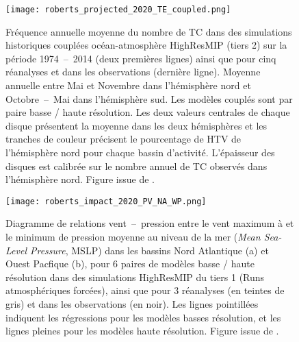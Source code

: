 \documentclass[../main.tex]{subfiles}
\begin{document}
\begin{figure}[tb]
    \centering
    \texttt{[image: roberts\_projected\_2020\_TE\_coupled.png]}
    \caption{Fréquence annuelle moyenne du nombre de TC dans des simulations historiques couplées océan-atmosphère HighResMIP (tiers 2) sur la période
        \num{1974}~--~\num{2014} (deux premières lignes) ainsi que pour cinq réanalyses et dans les observations (dernière ligne). Moyenne annuelle entre Mai et
        Novembre dans l'hémisphère nord et Octobre~--~Mai dans l'hémisphère sud. Les modèles couplés sont par paire basse / haute résolution. Les deux valeurs
        centrales de chaque disque présentent la moyenne dans les deux hémisphères et les tranches de couleur précisent le pourcentage de HTV de l'hémisphère
        nord pour chaque bassin d'activité. L'épaisseur des disques est calibrée sur le nombre annuel de TC observés dans l'hémisphère nord. Figure issue de
        \hbox{\cite{roberts_projected_2020}}.}
        \label{fig:NTC_HighResMIP}
\end{figure}
\begin{figure}[tb]
    \centering
    \texttt{[image: roberts\_impact\_2020\_PV\_NA\_WP.png]}
    \caption{Diagramme de relations vent~--~pression entre le vent maximum à  et le minimum de pression moyenne au niveau de la mer (\textit{Mean
        Sea-Level Pressure}, MSLP) dans les bassins Nord Atlantique (a) et Ouest Pacfique (b), pour \num{6} paires de modèles basse / haute résolution dans des
        simulations HighResMIP du tiers \num{1} (Runs atmosphériques forcées), ainsi que pour \num{3} réanalyses (en teintes de gris) et dans les observations
        (en noir). Les lignes pointillées indiquent les régressions pour les modèles basses résolution, et les lignes pleines pour les modèles haute résolution.
        Figure issue de \hbox{\cite{roberts_impact_2020}}.}
    \label{fig:roberts_PV_resolution}
\end{figure}
\end{document}
